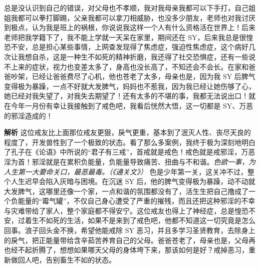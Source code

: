 \begin{case}
    总是没认识到自己的错误，对父母也不孝顺，我对我母亲我都可以下手打，自己姐姐我都可以拳打脚踢，父亲我都可以拿刀相威胁，也没多少朋友，老师也对我讨厌到极点，认为我是班上的祸根，你说说我这样一个人有什么资格活在世界上！后来老师把我学籍下了，我不能上学就一天呆在家里，期间还在 SY，后来我总是很惶恐不安，总是担心某些事情，上网查发现得了焦虑症，强迫性焦虑症，这个病好几次让我想自杀，这是一种生不如死的精神折磨，我还得了社交恐惧症，还有一些说不上来的症状，视力也变差太多了，身高也没长高了，不知还会不会长。在家和爸爸吵架，已经让爸爸费尽了心机，他也苍老了太多，母亲也是，因为我 SY 后脾气变得极为暴躁，一点不好就大发脾气，妈妈也不惹我，因为我已经让她伤够了心，她已经对我失望了，对我失去期望了！还有太多的不堪的事，我都无法说出口！就在今年一月份有幸让我接触到了戒色吧，我看后恍然大悟，这一切都是 SY、万恶的邪淫造成的！

    \textbf{解析} 这位戒友比上面那位戒友更狠，戾气更重，基本到了泯灭人性、丧尽天良的程度了，开发兽性到了一个极致的状态。看了那么多案例，我终于极为深刻地明白了孔子在《论语》中所说的“君子有三戒”，首戒就是戒色！戒色就是戒邪淫，万恶淫为首！邪淫就是在累积负能量，负能量导致痛苦、扭曲与不和谐。\textit{色欲一事，为人生第一大要命关口，最恶最毒。（《通关文》）} 色是少年第一关，这关冲不过，整个人生迟早会陷入灰暗与困境。在沉迷 SY 后，他的脾气变得极为暴躁，动不动就大发脾气，这哪里还像一个家，一点和谐的氛围都没有了，活生生把自己撸成了一个负能量的“霉气罐”，不仅自己身心遭受了严重的摧残，而且还把这种邪淫的不幸与灾难带给了家人，整个家庭都不得安宁。这位戒友也得上了神经症，总是惶恐不安，过着生不如死的生活，如果不是来到了戒色吧，他都不知道这一切究竟是怎么回事。浪子回头金不换，希望他能戒除 SY 恶习，并且多学习圣贤教育，去除身上的戾气，把正能量带给含辛茹苦养育自己的父母。爸爸苍老了，母亲也是，父母再也经不起折腾了，想想如果哪天父母的身体垮下来，那该如何是好？戒掉恶习，重新做回人吧，告别畜生不如的状态。
\end{case}

